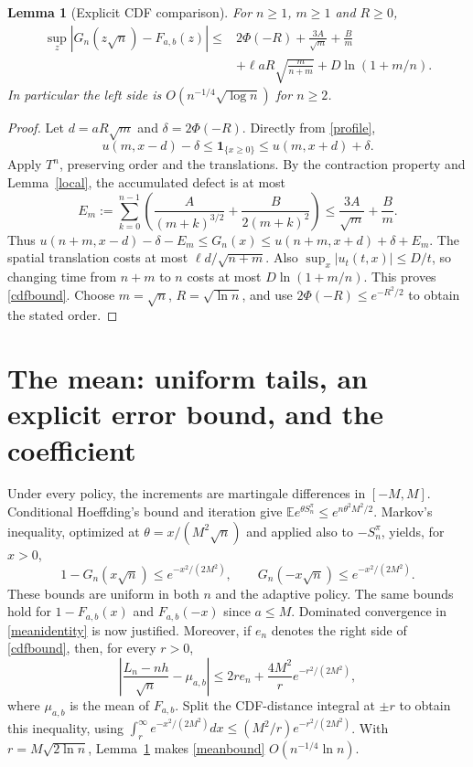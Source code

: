 \documentclass[10pt,a4paper]{article}
\newtheorem{lemma}[theorem]{Lemma}
\newcommand{\E}{\mathbb E}
\begin{document}
\begin{lemma}[Explicit CDF comparison]\label{cdf}
For $n\ge1$, $m\ge1$ and $R\ge0$,
\begin{align}\label{cdfbound}
 \sup_z|G_n(z\sqrt n)-F_{a,b}(z)|\le{}&2\Phi(-R)
   +\frac{3A}{\sqrt m}+\frac Bm\\
 &+\ell aR\sqrt{\frac m{n+m}}
   +D\ln(1+m/n).\nonumber
\end{align}
In particular the left side is $O(n^{-1/4}\sqrt{\log n})$ for $n\ge2$.
\end{lemma}
\begin{proof}
Let $d=aR\sqrt m$ and $\delta=2\Phi(-R)$. Directly from \eqref{profile},
\[
 u(m,x-d)-\delta\le\mathbf1_{\{x\ge0\}}
                       \le u(m,x+d)+\delta.
\]
Apply $T^n$, preserving order and the translations. By the contraction
property and Lemma~\ref{local}, the accumulated defect is at most
\[
 E_m:=\sum_{k=0}^{n-1}\left(\frac A{(m+k)^{3/2}}
                         +\frac B{2(m+k)^2}\right)
 \le\frac{3A}{\sqrt m}+\frac Bm.
\]
Thus $u(n+m,x-d)-\delta-E_m\le G_n(x)
\le u(n+m,x+d)+\delta+E_m$.
The spatial translation costs at most $\ell d/\sqrt{n+m}$.
Also $\sup_x|u_t(t,x)|\le D/t$, so changing time from $n+m$ to $n$
costs at most $D\ln(1+m/n)$. This proves \eqref{cdfbound}.
Choose $m=\sqrt n$, $R=\sqrt{\ln n}$, and use
$2\Phi(-R)\le e^{-R^2/2}$ to obtain the stated order.
\end{proof}

\section{The mean: uniform tails, an explicit error bound, and the coefficient}
Under every policy, the increments are martingale differences in $[-M,M]$.
Conditional Hoeffding's bound and iteration give
$\E e^{\theta S_n^\pi}\le e^{n\theta^2M^2/2}$.
Markov's inequality, optimized at $\theta=x/(M^2\sqrt n)$ and applied also
to $-S_n^\pi$, yields, for $x>0$,
\begin{equation}\label{tails}
 1-G_n(x\sqrt n)\le e^{-x^2/(2M^2)},\qquad
 G_n(-x\sqrt n)\le e^{-x^2/(2M^2)}.
\end{equation}
These bounds are uniform in both $n$ and the adaptive policy. The same
bounds hold for $1-F_{a,b}(x)$ and $F_{a,b}(-x)$ since $a\le M$.
Dominated convergence in \eqref{meanidentity} is now justified.
Moreover, if $e_n$ denotes the right side of \eqref{cdfbound}, then, for every $r>0$,
\begin{equation}\label{meanbound}
 \left|\frac{L_n-nh}{\sqrt n}-\mu_{a,b}\right|
 \le 2r e_n+\frac{4M^2}{r}e^{-r^2/(2M^2)},
\end{equation}
where $\mu_{a,b}$ is the mean of $F_{a,b}$. Split the CDF-distance integral
at $\pm r$ to obtain this inequality, using
$\int_r^\infty e^{-x^2/(2M^2)}dx\le(M^2/r)e^{-r^2/(2M^2)}$.
With $r=M\sqrt{2\ln n}$, Lemma~\ref{cdf} makes \eqref{meanbound}
$O(n^{-1/4}\ln n)$.
\end{document}
